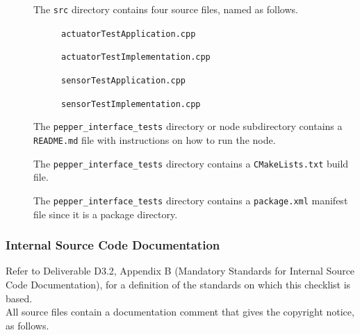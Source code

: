 \documentclass{CSSRforAfrica}
\newcommand{\checkboxChecked}{\fbox{\ding{51}}} %
\begin{document}
\begin{description}
\item[\checkboxChecked] The  {\small \verb+src+} directory contains four source files, named as follows.
\begin{description}
\item[\checkboxChecked] {\small \verb+actuatorTestApplication.cpp+}  
\item[\checkboxChecked]  {\small \verb+actuatorTestImplementation.cpp+} 
\item[\checkboxChecked] {\small \verb+sensorTestApplication.cpp+}  
\item[\checkboxChecked]  {\small \verb+sensorTestImplementation.cpp+} 
\end{description} 

\item[\checkboxChecked] The {\small \verb+pepper_interface_tests+} directory or node subdirectory contains  a {\small \verb+README.md+} file with  instructions on how to run the node. 

\item[\checkboxChecked] The {\small \verb+pepper_interface_tests+} directory contains  a {\small \verb+CMakeLists.txt+} build file.

\item[\checkboxChecked] The {\small \verb+pepper_interface_tests+} directory contains  a {\small \verb+package.xml+} manifest file since it is a package directory.

\end{description}

\subsubsection{Internal Source Code Documentation}

Refer to Deliverable D3.2, Appendix B (Mandatory Standards for Internal Source Code Documentation), for a definition of the standards on which this checklist is based.\\

\noindent All source files contain a documentation comment that gives the copyright notice, as follows.
 
\end{document}
